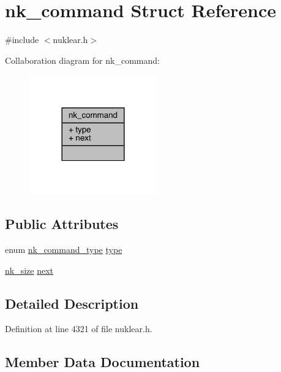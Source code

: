 \hypertarget{structnk__command}{}\section{nk\+\_\+command Struct Reference}
\label{structnk__command}


{\ttfamily \#include $<$nuklear.\+h$>$}



Collaboration diagram for nk\+\_\+command\+:
\nopagebreak
\begin{figure}[H]
\begin{center}
\leavevmode
\includegraphics[width=156pt]{structnk__command__coll__graph}
\end{center}
\end{figure}
\subsection*{Public Attributes}
\begin{DoxyCompactItemize}
\item 
enum \mbox{\hyperlink{nuklear_8h_ac22c9697f5a0310b11c61832f62accda}{nk\+\_\+command\+\_\+type}} \mbox{\hyperlink{structnk__command_a0bd82809bee01cfb621f9ebcabd050b5}{type}}
\item 
\mbox{\hyperlink{nuklear_8h_a84c0fc50dec5501be327b33d41d9010c}{nk\+\_\+size}} \mbox{\hyperlink{structnk__command_a5b3ef494f3ab1e30cb7822499a5a7b56}{next}}
\end{DoxyCompactItemize}


\subsection{Detailed Description}


Definition at line 4321 of file nuklear.\+h.



\subsection{Member Data Documentation}
\mbox{\label{structnk__command_a5b3ef494f3ab1e30cb7822499a5a7b56}} 

